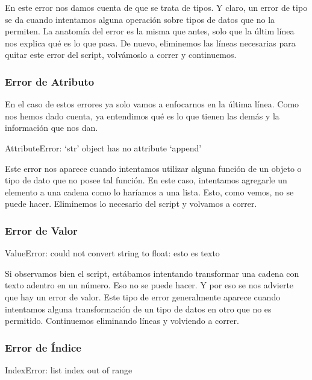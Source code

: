 \documentclass[10pt,letterpaper]{article}
\newenvironment{Code}
{
\begin{lrbox}{\selvestebox}%
\begin{minipage}{\dimexpr\columnwidth-2\fboxsep\relax}
\fontfamily{\ttdefault}\selectfont
}
{\end{minipage}\end{lrbox}%
\begin{center}
\colorbox{light-gray}{\usebox{\selvestebox}}
\end{center}
}
\begin{document}
En este error nos damos cuenta de que se trata de tipos. Y claro, un error de tipo se da cuando intentamos alguna operaci\'on sobre tipos de datos que no la permiten. La anatom\'ia del error es la misma que antes, solo que la \'ultim l\'inea nos explica qu\'e es lo que pasa. De nuevo, eliminemos las l\'ineas necesarias para quitar este error del script, volv\'amoslo a correr y continuemos.

\subsubsection{Error de Atributo}
En el caso de estos errores ya solo vamos a enfocarnos en la \'ultima l\'inea. Como nos hemos dado cuenta, ya entendimos qu\'e es lo que tienen las dem\'as y la informaci\'on que nos dan.

\begin{Code}
{\color{red} AttributeError: `str' object has no attribute `append'}
\end{Code}

Este error nos aparece cuando intentamos utilizar alguna funci\'on de un objeto o tipo de dato que no posee tal funci\'on. En este caso, intentamos agregarle un elemento a una cadena como lo har\'iamos a una lista. Esto, como vemos, no se puede hacer. Eliminemos lo necesario del script y volvamos a correr.

\subsubsection{Error de Valor}

\begin{Code}
{\color{red} ValueError: could not convert string to float: esto es texto}
\end{Code}

Si observamos bien el script, est\'abamos intentando transformar una cadena con texto adentro en un n\'umero. Eso no se puede hacer. Y por eso se nos advierte que hay un error de valor. Este tipo de error generalmente aparece cuando intentamos alguna transformaci\'on de un tipo de datos en otro que no es permitido. Continuemos eliminando l\'ineas y volviendo a correr.

\subsubsection{Error de \'Indice}

\begin{Code}
{\color{red} IndexError: list index out of range}
\end{Code}
\end{document}
